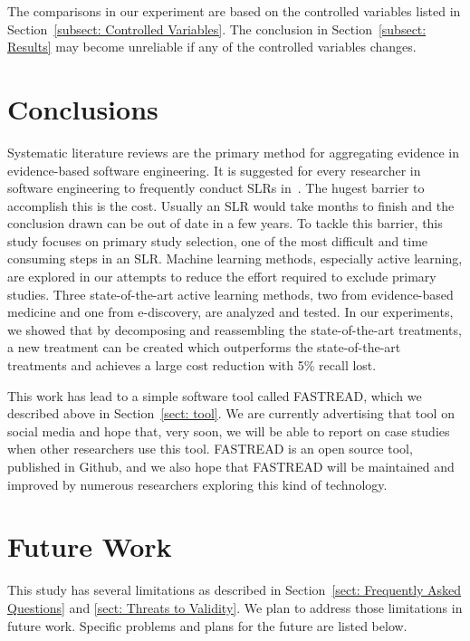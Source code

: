 \documentclass{svjour3}
\theoremstyle{break}
\begin{document}
The comparisons in our experiment are based on the controlled variables listed in Section~\ref{subsect: Controlled Variables}. The conclusion in Section~\ref{subsect: Results} may become unreliable if any of the controlled variables changes.



\section{Conclusions}\label{sect: Conclusion}

Systematic literature reviews are the primary method for aggregating evidence in evidence-based software engineering. It is suggested for every researcher in software engineering to frequently conduct SLRs in~\cite{keele2007guidelines}. The hugest barrier to accomplish this is the cost. Usually an SLR would take months to finish and the conclusion drawn can be out of date in a few years. To tackle this barrier, this study focuses on primary study selection, one of the most difficult and time consuming steps in an SLR. Machine learning methods, especially active learning, are explored in our attempts to reduce the effort required to exclude primary studies. Three state-of-the-art active learning methods, two from evidence-based medicine and one from e-discovery, are analyzed and tested. In our experiments, we showed that by decomposing and reassembling the state-of-the-art treatments, a new treatment can be created which outperforms the state-of-the-art treatments and achieves a large cost reduction with 5\% recall lost.  

This work has lead to a simple software tool called FASTREAD, which
we described above in Section~\ref{sect: tool}. We are currently advertising
that tool on social media and hope that, very soon,
we will be  able to report on
case studies when other researchers use this tool. FASTREAD is
an open source tool, published in Github, and we also hope
that FASTREAD will be maintained and improved by numerous 
researchers exploring this kind of technology. 

\section{Future Work}
This study has several limitations as described in Section~\ref{sect: Frequently Asked Questions} and \ref{sect: Threats to Validity}. We plan to address those limitations in future work. Specific problems and plans for the future are listed below.
\end{document}
